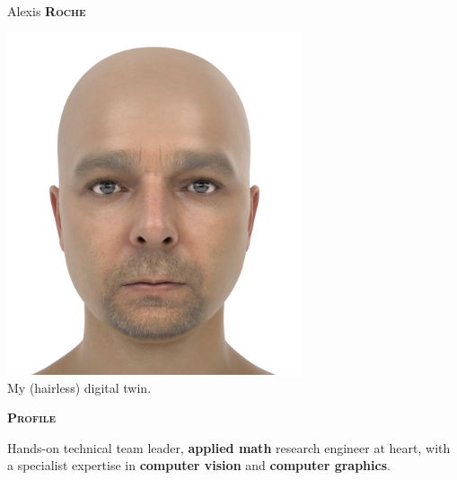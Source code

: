 \documentclass[11pt, a4paper]{article}
\newcommand{\headleft}[1]{\vspace*{3ex}\textsc{\textbf{#1}}\par%
    \vspace*{-1.5ex}\hrulefill\par\vspace*{0.7ex}}
\begin{document}
\setlength{\topskip}{0pt}
\setlength{\parindent}{0pt}
\setlength{\parskip}{0pt}
\setlength{\fboxsep}{0pt}
\pagestyle{empty}
\raggedbottom

\begin{minipage}[t]{0.33\textwidth} %
\colorbox{cvblue}{\begin{minipage}[t][5mm][t]{\textwidth}\null\hfill\null\end{minipage}}

\vspace{-.2ex} %
\colorbox{cvblue!90}{\color{white}  %
\textwidth\relax%
\begin{minipage}[t][293mm][t]{0.82\textwidth}
\raggedright
\vspace*{2.5ex}

\Large Alexis \textbf{\textsc{Roche}} \normalsize 

\null\hfill
\begin{center}
  \includegraphics[width=0.65\textwidth]{alexis_didimo_cropped.png}\\
  {\scriptsize My (hairless) digital twin.}
\end{center}
\hfill\null

\vspace*{0.5ex} %

\headleft{Profile}
 Hands-on technical team leader, {\bf applied math} research engineer at heart, with a specialist expertise in {\bf computer vision} and {\bf computer graphics}. 


\end{minipage}}
\end{minipage}
\end{document}
